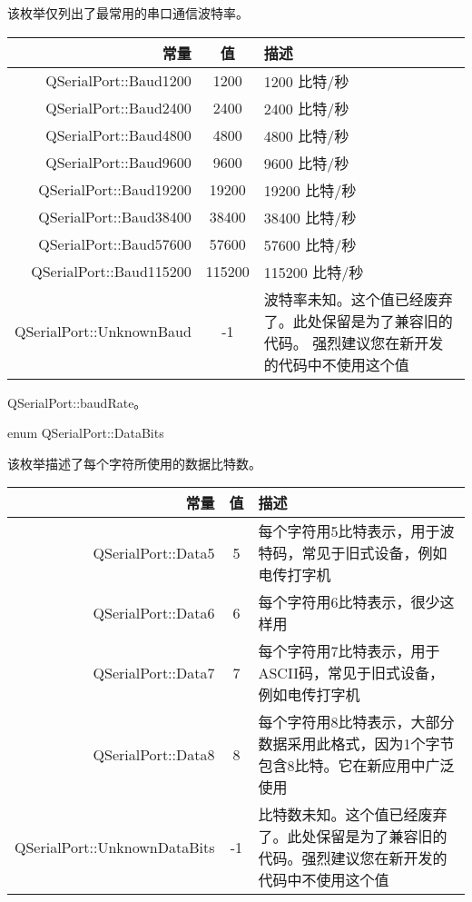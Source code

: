 \begin{notice}
该枚举仅列出了最常用的串口通信波特率。
\end{notice}


\begin{longtable}[l]{|r|c|m{20em}|}
\hline
常量	&值&	描述 \\ 
\hline
QSerialPort::Baud1200 &	1200&	1200 比特/秒 \\ 
\hline
QSerialPort::Baud2400	&2400&	2400 比特/秒 \\ 
\hline
QSerialPort::Baud4800	&4800&	4800 比特/秒 \\ 
\hline
QSerialPort::Baud9600	&9600&	9600 比特/秒 \\ 
\hline
QSerialPort::Baud19200	&19200&	19200 比特/秒 \\ 
\hline
QSerialPort::Baud38400	&38400	&38400 比特/秒 \\ 
\hline
QSerialPort::Baud57600	&57600	&57600 比特/秒 \\ 
\hline
QSerialPort::Baud115200&	115200&	115200 比特/秒 \\ 
\hline
QSerialPort::UnknownBaud	&-1	&波特率未知。这个值已经废弃了。此处保留是为了兼容旧的代码。
 强烈建议您在新开发的代码中不使用这个值 \\ 
\hline
\end{longtable}

\begin{seeAlso}
QSerialPort::baudRate。
\end{seeAlso}

enum QSerialPort::DataBits

该枚举描述了每个字符所使用的数据比特数。

\begin{longtable}[l]{|r|c|m{20em}|}
\hline
常量	&值&	描述 \\ 
\hline 
QSerialPort::Data5 &	5&	每个字符用5比特表示，用于波特码，常见于旧式设备，例如电传打字机 \\ 
\hline
QSerialPort::Data6	&6&	每个字符用6比特表示，很少这样用 \\ 
\hline
QSerialPort::Data7&	7&	每个字符用7比特表示，用于ASCII码，常见于旧式设备，例如电传打字机 \\ 
\hline
QSerialPort::Data8	&8	&每个字符用8比特表示，大部分数据采用此格式，因为1个字节包含8比特。它在新应用中广泛使用 \\ 
\hline
QSerialPort::UnknownDataBits&	-1&	比特数未知。这个值已经废弃了。此处保留是为了兼容旧的代码。强烈建议您在新开发的代码中不使用这个值 \\ 
	\hline
\end{longtable}

